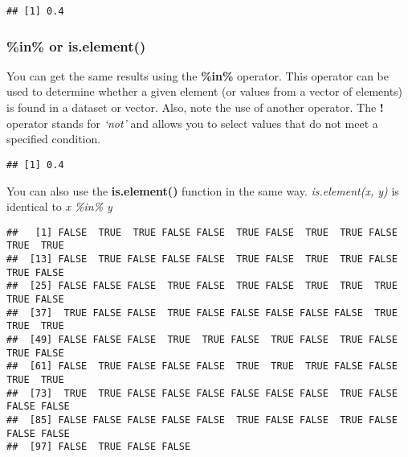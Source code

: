 \documentclass[
]{article}
\newenvironment{Shaded}{\begin{snugshade}}{\end{snugshade}}
\newcommand{\FunctionTok}[1]{\textcolor[rgb]{0.13,0.29,0.53}{\textbf{#1}}}
\newcommand{\NormalTok}[1]{#1}
\newcommand{\OtherTok}[1]{\textcolor[rgb]{0.56,0.35,0.01}{#1}}
\newcommand{\SpecialCharTok}[1]{\textcolor[rgb]{0.81,0.36,0.00}{\textbf{#1}}}
\newcommand{\StringTok}[1]{\textcolor[rgb]{0.31,0.60,0.02}{#1}}
\begin{document}
\begin{verbatim}
## [1] 0.4
\end{verbatim}

\subsubsection{\%in\% or is.element()}\label{in-or-is.element}

You can get the same results using the \textbf{\%in\%} operator. This
operator can be used to determine whether a given element (or values
from a vector of elements) is found in a dataset or vector. Also, note
the use of another operator. The \textbf{!} operator stands for
\emph{`not'} and allows you to select values that do not meet a
specified condition.

\begin{Shaded}
\end{Shaded}

\begin{verbatim}
## [1] 0.4
\end{verbatim}

You can also use the \textbf{is.element()} function in the same way.
\emph{is.element(x, y)} is identical to \emph{x \%in\% y}

\begin{Shaded}
\end{Shaded}

\begin{verbatim}
##   [1] FALSE  TRUE  TRUE FALSE FALSE  TRUE FALSE  TRUE  TRUE FALSE  TRUE  TRUE
##  [13] FALSE  TRUE FALSE FALSE FALSE  TRUE FALSE  TRUE  TRUE FALSE  TRUE FALSE
##  [25] FALSE FALSE FALSE  TRUE FALSE  TRUE FALSE  TRUE  TRUE  TRUE  TRUE FALSE
##  [37]  TRUE FALSE FALSE  TRUE FALSE FALSE FALSE FALSE FALSE  TRUE  TRUE  TRUE
##  [49] FALSE FALSE FALSE  TRUE  TRUE FALSE  TRUE FALSE  TRUE FALSE  TRUE FALSE
##  [61] FALSE  TRUE FALSE FALSE FALSE  TRUE  TRUE  TRUE FALSE FALSE  TRUE  TRUE
##  [73]  TRUE  TRUE FALSE FALSE FALSE FALSE FALSE FALSE  TRUE FALSE FALSE FALSE
##  [85] FALSE FALSE FALSE FALSE FALSE  TRUE FALSE FALSE  TRUE FALSE FALSE FALSE
##  [97] FALSE  TRUE FALSE FALSE
\end{verbatim}
\end{document}
